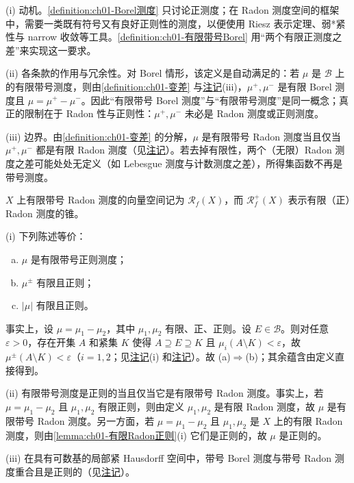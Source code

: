 \documentclass[../../main.tex]{subfiles}%
\begin{document}
\begin{remark}\label{remark:ch01-有限带号Borel动机}
(i) 动机。\cref{definition:ch01-Borel测度} 只讨论正测度；在 Radon 测度空间的框架中，需要一类既有符号又有良好正则性的测度，以便使用 Riesz 表示定理、弱*紧性与 narrow 收敛等工具。\cref{definition:ch01-有限带号Borel} 用“两个有限正测度之差”来实现这一要求。

(ii) 各条款的作用与冗余性。对 Borel 情形，该定义是自动满足的：若 $\mu$ 是 $\mathcal{B}$ 上的有限带号测度，则由\cref{definition:ch01-变差} 与\hyperref[remark:ch01-Jordan性质]{注记}(iii)，$\mu^+,\mu^-$ 是有限 Borel 测度且 $\mu=\mu^+-\mu^-$。因此“有限带号 Borel 测度”与“有限带号测度”是同一概念；真正的限制在于 Radon 性与正则性：$\mu^+,\mu^-$ 未必是 Radon 测度或正则测度。

(iii) 边界。由\cref{definition:ch01-变差} 的分解，$\mu$ 是有限带号 Radon 测度当且仅当 $\mu^+,\mu^-$ 都是有限 Radon 测度（见\hyperref[remark:ch01-有限带号正则]{注记}）。若去掉有限性，两个（无限）Radon 测度之差可能处处无定义（如 Lebesgue 测度与计数测度之差），所得集函数不再是带号测度。
\end{remark}

$X$ 上有限带号 Radon 测度的向量空间记为 $\mathscr{R}_f(X)$，而 $\mathscr{R}^+_f(X)$ 表示有限（正）Radon 测度的锥。

\begin{remark}\label{remark:ch01-有限带号正则}
(i) 下列陈述等价：
\begin{enumerate}[(a)]
\item $\mu$ 是有限带号正则测度；
\item $\mu^\pm$ 有限且正则；
\item $|\mu|$ 有限且正则。
\end{enumerate}
事实上，设 $\mu=\mu_1-\mu_2$，其中 $\mu_1,\mu_2$ 有限、正、正则。设 $E\in\mathcal{B}$。则对任意 $\varepsilon>0$，存在开集 $A$ 和紧集 $K$ 使得 $A\supseteq E\supseteq K$ 且 $\mu_i(A\setminus K)<\varepsilon$，故 $\mu^\pm(A\setminus K)<\varepsilon$（$i=1,2$；见\hyperref[remark:ch01-Borel测度性质]{注记}(i) 和\hyperref[remark:ch01-Jordan性质]{注记}）。故 (a)$\Rightarrow$(b)；其余蕴含由定义直接得到。

(ii) 有限带号测度是正则的当且仅当它是有限带号 Radon 测度。事实上，若 $\mu=\mu_1-\mu_2$ 且 $\mu_1,\mu_2$ 有限正则，则由定义 $\mu_1,\mu_2$ 是有限 Radon 测度，故 $\mu$ 是有限带号 Radon 测度。另一方面，若 $\mu=\mu_1-\mu_2$ 且 $\mu_1,\mu_2$ 是 $X$ 上的有限 Radon 测度，则由\cref{lemma:ch01-有限Radon正则}(i) 它们是正则的，故 $\mu$ 是正则的。

(iii) 在具有可数基的局部紧 Hausdorff 空间中，带号 Borel 测度与带号 Radon 测度重合且是正则的（见\hyperref[remark:ch01-BorelRadon一致]{注记}）。
\end{remark}
\end{document}
